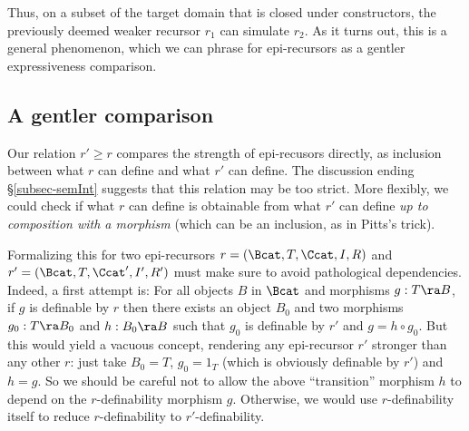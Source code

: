 Thus, on a %
subset of the target domain that is closed under constructors,  the previously deemed weaker recursor $r_1$ can simulate $r_2$. %
As it turns out, this is a general phenomenon, which we can phrase %
for epi-recursors as %
a gentler expressiveness comparison.  


\vspace*{-0.5ex}\subsection{A gentler comparison}
\label{subsec-moreGentle}

Our relation $r' \geq r$ compares the strength of epi-recusors directly, 
as %
inclusion between what $r$ can define and what $r'$ can define. 
The discussion ending \S\ref{subsec-semInt} 
suggests that this relation 
may be too strict. %
More flexibly, we could check if what $r$ can define is obtainable from what $r'$ can define \emph{up to composition with a morphism} (which can be %
an inclusion, as in Pitts's trick).  

Formalizing this 
for two epi-recursors $r = (\Bcat,T,\Ccat,I,R)$ and $r' = (\Bcat,T,\Ccat',I',R')$ must make sure to avoid pathological dependencies. 
%
Indeed, a first attempt is: For all objects $B$ in $\Bcat$ and morphisms 
$g: T \ra B$, if $g$ is definable by $r$ then there exists an object $B_0$ 
and two morphisms $g_0: T \ra B_0$ and $h:B_0\ra B$ such that $g_0$ is definable by $r'$ and $g = h \circ g_0$.  %
But this would yield a vacuous concept, rendering any epi-recursor $r'$ stronger than any other $r$: just take $B_0=T$, $g_0=1_T$ (which is obviously definable by $r'$) and $h=g$. %
So we should be careful not to allow the above %
``transition'' morphism $h$ 
to depend on the $r$-definability morphism $g$.  
Otherwise, we would use $r$-definability itself to reduce $r$-definability to $r'$-definability. %
%
%


